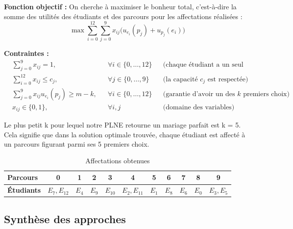 \documentclass{article}
\begin{document}
\vspace{0.3cm}
\noindent\textbf{Fonction objectif :} 
On cherche à maximiser le bonheur total, c'est-à-dire la somme des utilités des étudiants et des parcours pour les affectations réalisées :
\[ \max \sum_{i=0}^{12} \sum_{j=0}^{9} x_{ij} \Big( u_{e_i}(p_j) + u_{p_j}(e_i) \Big) \]

\vspace{0.3cm}
\noindent\textbf{Contraintes :}
\begin{align*}
& \sum_{j=0}^{9} x_{ij} = 1, && \forall i \in \{0,\dots,12\} && \text{(chaque étudiant a un seul parcours)} \\
& \sum_{i=0}^{12} x_{ij} \leq c_j, && \forall j \in \{0,\dots,9\} && \text{(la capacité $c_j$ est respectée)} \\
& \sum_{j=0}^{9} x_{ij} u_{e_i}(p_j) \geq m - k, && \forall i \in \{0,\dots,12\} && \text{(garantie d'avoir un des $k$ premiers choix)} \\
& x_{ij} \in \{0, 1\}, && \forall i, j && \text{(domaine des variables)}
\end{align*}

Le plus petit k pour lequel notre PLNE retourne un mariage parfait est k = 5. Cela signifie que dans la solution optimale trouvée, chaque étudiant est affecté à un parcours figurant parmi ses 5 premiers choix.

\begin{table}[htbp]
  \centering
  \renewcommand{\arraystretch}{1.5} 
  
  \caption{Affectations obtenues}
  \vspace{8pt}
  \label{tab:resultat_affectation}
  
  \begin{tabular}{l | c | c | c | c | c | c | c | c | c | c}
    \toprule
    \textbf{Parcours} & \textbf{0} & \textbf{1} & \textbf{2} & \textbf{3} & \textbf{4} & \textbf{5} & \textbf{6} & \textbf{7} & \textbf{8} & \textbf{9} \\
    \midrule
    \textbf{Étudiants} & $E_7, E_{12}$ & $E_4$ & $E_9$ & $E_{10}$ & $E_{2}, E_{11}$ & $E_1$ & $E_8$ & $E_6$ & $E_{0}$ & $E_3, E_5$ \\
    \bottomrule
  \end{tabular}
\end{table}

\newpage
\subsection{Synthèse des approches}
\end{document}
